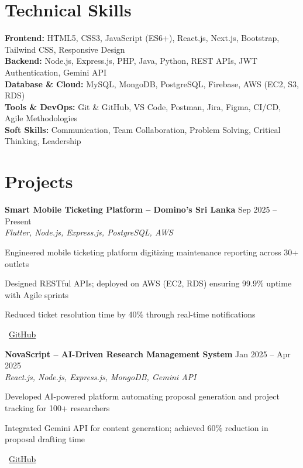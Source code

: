 \documentclass[letterpaper,10pt]{article}
\newenvironment{resume_list}{
  \vspace{-2pt}
  \begin{itemize}[itemsep=1pt, leftmargin=14pt]
}{
  \end{itemize}\vspace{-3pt}
}
\begin{document}
\section{Technical Skills}
\vspace{-1pt}

\textbf{Frontend:} HTML5, CSS3, JavaScript (ES6+), React.js, Next.js, Bootstrap, Tailwind CSS, Responsive Design\\[2pt]
\textbf{Backend:} Node.js, Express.js, PHP, Java, Python, REST APIs, JWT Authentication, Gemini API\\[2pt]
\textbf{Database \& Cloud:} MySQL, MongoDB, PostgreSQL, Firebase, AWS (EC2, S3, RDS)\\[2pt]
\textbf{Tools \& DevOps:} Git \& GitHub, VS Code, Postman, Jira, Figma, CI/CD, Agile Methodologies\\[2pt]
\textbf{Soft Skills:} Communication, Team Collaboration, Problem Solving, Critical Thinking, Leadership

\section{Projects}
\vspace{-1pt}

\textbf{Smart Mobile Ticketing Platform – Domino's Sri Lanka} \hfill Sep 2025 – Present\\
\textit{Flutter, Node.js, Express.js, PostgreSQL, AWS}\\
\begin{resume_list}
  \item Engineered mobile ticketing platform digitizing maintenance reporting across 30+ outlets
  \item Designed RESTful APIs; deployed on AWS (EC2, RDS) ensuring 99.9\% uptime with Agile sprints
  \item Reduced ticket resolution time by 40\% through real-time notifications
  \item \faGithub~\href{https://github.com/fixpoint-tech}{GitHub}
\end{resume_list}

\textbf{NovaScript – AI-Driven Research Management System} \hfill Jan 2025 – Apr 2025\\
\textit{React.js, Node.js, Express.js, MongoDB, Gemini API}\\
\begin{resume_list}
  \item Developed AI-powered platform automating proposal generation and project tracking for 100+ researchers
  \item Integrated Gemini API for content generation; achieved 60\% reduction in proposal drafting time
  \item \faGithub~\href{https://github.com/Chandima0406/NovaScript.git}{GitHub}
\end{resume_list}
\end{document}
